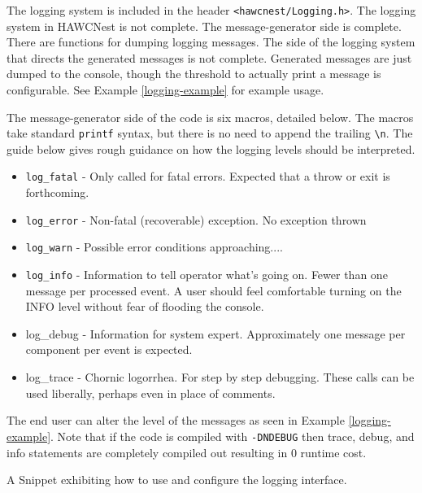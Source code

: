 \documentclass[12pt]{article}
\begin{document}
The logging system is included in the 
header {\tt <hawcnest/Logging.h>}.
The logging system in HAWCNest is not complete. The message-generator
side is complete. There are functions for dumping logging messages. The 
side of the logging system that directs the generated messages
is not complete.  Generated messages are just dumped to the console, though
the threshold to actually print a message is configurable.  See Example 
\ref{logging-example} for example usage.

The message-generator side of the code is six macros, detailed below.
The macros take standard {\tt printf} syntax, but there is no need
to append the trailing {\tt \textbackslash n}.  The guide below gives 
rough guidance on how the logging levels should be interpreted.

\begin{itemize}

\item {\tt log\_fatal} - Only called for fatal errors. Expected that a throw or exit is forthcoming.

\item {\tt log\_error} - Non-fatal (recoverable) exception. No exception thrown

\item {\tt log\_warn} - Possible error conditions approaching....

\item {\tt log\_info} - Information to tell operator what's going on.  Fewer 
than 
one message per processed event. A user should feel comfortable turning on 
the INFO level without fear of flooding the console.

\item log\_debug - Information for system expert. Approximately one message 
per component per event is expected.

\item log\_trace - Chornic logorrhea. For step by step debugging. These calls
can be used liberally, perhaps even in place of comments.

\end{itemize}

The end user can alter the level of the messages as seen in Example 
\ref{logging-example}.  Note that if the code is compiled with {\tt -DNDEBUG}
then trace, debug, and info statements are completely compiled out
resulting in 0 runtime cost.  

\begin{example}

\caption{A Snippet exhibiting how to use and configure the logging interface.}
\label{logging-example}
\end{example}
\end{document}
